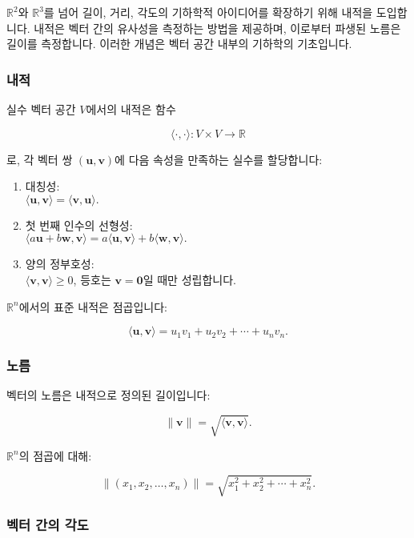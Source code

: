 \documentclass[
  12pt,
  a4paper,
]{article}
\begin{document}
\(\mathbb{R}^2\)와 \(\mathbb{R}^3\)를 넘어 길이, 거리, 각도의 기하학적 아이디어를 확장하기 위해 내적을 도입합니다. 내적은 벡터 간의 유사성을 측정하는 방법을 제공하며, 이로부터 파생된 노름은 길이를 측정합니다. 이러한 개념은 벡터 공간 내부의 기하학의 기초입니다.

\subsubsection{내적}\label{inner-product}

실수 벡터 공간 \(V\)에서의 내적은 함수

\[\langle \cdot, \cdot \rangle : V \times V \to \mathbb{R}\]

로, 각 벡터 쌍 \((\mathbf{u}, \mathbf{v})\)에 다음 속성을 만족하는 실수를 할당합니다:

\begin{enumerate}
\def\labelenumi{\arabic{enumi}.}
\item
  대칭성:\\
  \(\langle \mathbf{u}, \mathbf{v} \rangle = \langle \mathbf{v}, \mathbf{u} \rangle.\)
\item
  첫 번째 인수의 선형성:\\
  \(\langle a\mathbf{u} + b\mathbf{w}, \mathbf{v} \rangle = a \langle \mathbf{u}, \mathbf{v} \rangle + b \langle \mathbf{w}, \mathbf{v} \rangle.\)
\item
  양의 정부호성:\\
  \(\langle \mathbf{v}, \mathbf{v} \rangle \geq 0\), 등호는 \(\mathbf{v} = \mathbf{0}\)일 때만 성립합니다.
\end{enumerate}

\(\mathbb{R}^n\)에서의 표준 내적은 점곱입니다:

\[\langle \mathbf{u}, \mathbf{v} \rangle = u_1 v_1 + u_2 v_2 + \cdots + u_n v_n.\]

\subsubsection{노름}\label{norms}

벡터의 노름은 내적으로 정의된 길이입니다:

\[\|\mathbf{v}\| = \sqrt{\langle \mathbf{v}, \mathbf{v} \rangle}.\]

\(\mathbb{R}^n\)의 점곱에 대해:

\[\|(x_1, x_2, \dots, x_n)\| = \sqrt{x_1^2 + x_2^2 + \cdots + x_n^2}.\]

\subsubsection{벡터 간의 각도}\label{angles-between-vectors-2}
\end{document}
